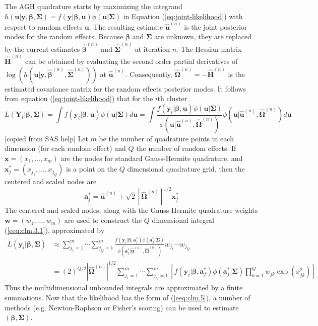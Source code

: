 		The AGH quadrature starts by maximizing the integrand $h(\bm u|\bm y, \bm \beta, \bm \Sigma)= f(\bm y|\bm \beta, \bm u)\phi(\bm u|\bm \Sigma)$ in Equation (\ref{eq:joint-likelihood}) with respect to random effects $\bm u$. The resulting estimate $\hat{\bm u}^{(n)}$ is the joint posterior modes for the random effects. Because $\bm \beta$ and $\bm \Sigma$ are unknown, they are replaced by the current estimates $\hat{\bm \beta}^{(n)}$ and $\hat{\bm \Sigma}^{(n)}$ at iteration $n$. The Hessian matrix $\hat{\bm H}^{(n)}$ can be obtained by evaluating the second order partial derivatives of $\log(h(\bm u|\bm y, \hat{\bm \beta}^{(n)}, \hat{\bm \Sigma}^{(n)}))$ at $\hat{\bm u}^{(n)}$. Consequently, $\hat{\bm \Omega}^{(n)} =-\hat{\bm H}^{(n)} $ is the estimated covariance matrix for the random effects posterior modes. It follows from equation (\ref{eq:joint-likelihood}) that for the $i$th cluster 
		\begin{equation}\label{eeq:clm.3.1}
		L( \bm Y_i|\bm \beta, \bm \Sigma) = \int f(\bm y_i|\bm \beta, \bm u )\phi(\bm u|\bm\Sigma)d\bm u = 
		\int \frac{f(\bm y_i|\bm \beta, \bm u )\phi(\bm u|\bm\Sigma)}{\phi(\bm u|\hat{\bm u}^{(n)},\hat{\bm \Omega}^{(n)} )}\phi(\bm u|\hat{\bm u}^{(n)},\hat{\bm \Omega}^{(n)} )d\bm u
		\end{equation}
		[copied from SAS help] Let $m$ be the number of quadrature points in each dimension (for each random effect) and $Q$ the number of random effects. If $\bm x = (x_1, \ldots, x_m)$ are the nodes for standard Gauss-Hermite quadrature, and $\bm x^{\ast}_j=(x_{j_1}, \ldots, x_{j_Q}) $ is a point on the $Q$ dimensional quadrature grid, then the centered and scaled nodes are 
		\begin{equation}\label{1.3.2}
		\bm  a_j^{\ast} = \hat{\bm u}^{(n)} + \sqrt{2} [\hat{\bm \Omega}^{(n)} ]^{1/2}\bm x^{\ast}_j
		\end{equation}
		The centered and scaled nodes, along with the Gauss-Hermite quadrature weights $\bm w = (w_1, \ldots, w_m)$ are used to construct the $Q$ dimensional integral (\ref{eeq:clm.3.1}), approximated by 
		\begin{equation}\label{eeq:clm.5}
		\begin{aligned}
		L(\bm y_i|\bm\beta, \bm \Sigma) &\approx\sum_{j_1=1}^m\cdots \sum_{j_Q=1}^m\frac{f(\bm y_i|\bm \beta, \bm  a_j^{\ast})\phi(\bm  a_j^{\ast}|\bm\Sigma)}{\phi(\bm  a_j^{\ast}|\hat{\bm u}^{(n)},\hat{\bm \Omega}^{(n)} )}w_{j_1}\cdots w_{j_Q}\\
		& = (2)^{Q/2}|\hat{\bm \Omega}^{(n)}|^{1/2}\sum_{j_1=1}^m\cdots \sum_{j_Q=1}^m\left[ f(\bm y_i|\bm \beta, \bm  a_j^{\ast} )\phi(\bm  a_j^{\ast}|\bm\Sigma) \prod_{k=1}^Qw_{jk}\exp(x_{jk}^2)\right]
		\end{aligned}
		\end{equation}
		Thus the multidimensional unbounded integrals are approximated by a finite summations. Now that the likelihood has the form of (\ref{eeq:clm.5}), a number of methods (e.g. Newton-Raphson or Fisher's scoring) can be used to estimate $(\bm \beta,  \bm \Sigma)$. 
		
